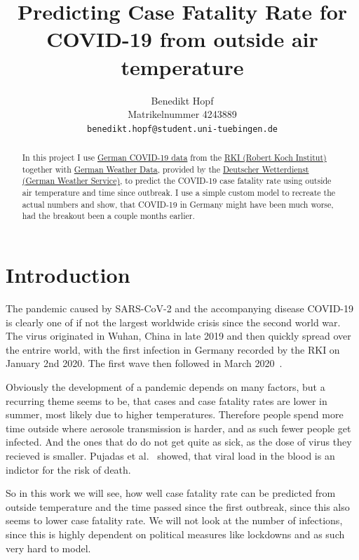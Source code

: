 \documentclass{article}
\title{Predicting Case Fatality Rate for COVID-19 from outside air temperature}
\author{%
  Benedikt Hopf\\
  Matrikelnummer 4243889\\
  \texttt{benedikt.hopf@student.uni-tuebingen.de} \\
}
\begin{document}
\maketitle

\begin{abstract}

  In this project I use \href{https://www.arcgis.com/sharing/rest/content/items/f10774f1c63e40168479a1feb6c7ca74/data}{German COVID-19 data} from the \href{https://www.rki.de/DE/Home/homepage_node.html}{RKI (Robert Koch Institut)} together with \href{https://opendata.dwd.de/climate_environment/CDC/observations_germany/climate/hourly/air_temperature/}{German Weather Data}, provided by the \href{https://www.dwd.de/DE/Home/home_node.html}{Deutscher Wetterdienst (German Weather Service)}, to predict the COVID-19 case fatality rate using outside air temperature and time since outbreak. I use a simple custom model to recreate the actual numbers and show, that COVID-19 in Germany might have been much worse, had the breakout been a couple months earlier.

\end{abstract}

\section{Introduction}
\label{sec:introduction}

The pandemic caused by SARS-CoV-2 and the accompanying disease COVID-19 is clearly one of if not the largest worldwide crisis since the second world war. The virus originated in Wuhan, China in late 2019 and then quickly spread over the entrire world, with the first infection in Germany recorded by the RKI on January 2nd 2020. The first wave then followed in March 2020~\cite{rki_2022}.  

Obviously the development of a pandemic depends on many factors, but a recurring theme seems to be, that cases and case fatality rates are lower in summer, most likely due to higher temperatures. Therefore people spend more time outside where aerosole transmission is harder, and as such fewer people get infected. And the ones that do do not get quite as sick, as the dose of virus they recieved is smaller. Pujadas et al.~\cite{pujadas_chaudhry_mcbride_richter_zhao_wajnberg_nadkarni_glicksberg_houldsworth_cordon-cardo_et_al._2020} showed, that viral load in the blood is an indictor for the risk of death.

So in this work we will see, how well case fatality rate can be predicted from outside temperature and the time passed since the first outbreak, since this also seems to lower case fatality rate. We will not look at the number of infections, since this is highly dependent on political measures like lockdowns and as such very hard to model. 
\end{document}
